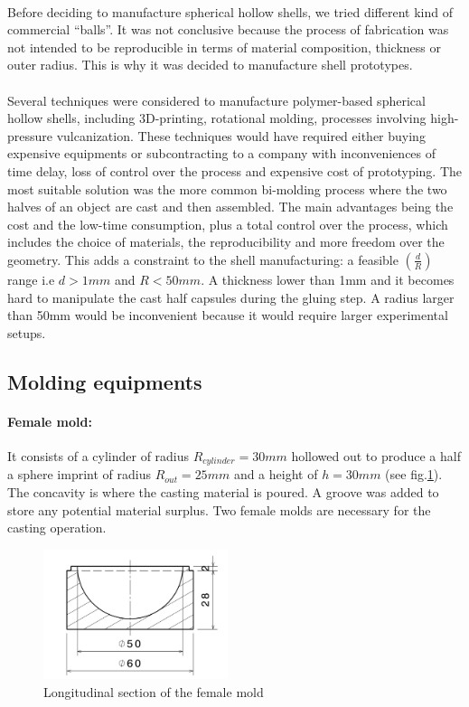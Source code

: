 \paragraph{}
Before deciding to manufacture spherical hollow shells, we tried different kind of commercial "`balls"'. It was not conclusive because the process of fabrication was not intended to be reproducible in terms of material composition, thickness or outer radius. This is why it was decided to manufacture shell prototypes.
\paragraph{}
Several techniques were considered to manufacture polymer-based spherical hollow shells, including 3D-printing, rotational molding, processes involving high-pressure vulcanization. These techniques would have required either buying expensive equipments or subcontracting to a company with inconveniences of time delay, loss of control over the process and expensive cost of prototyping. 
The most suitable solution was the more common bi-molding process where the two halves of an object are cast and then assembled. The main advantages being the cost and the low-time consumption, plus a total control over the process, which includes the choice of materials, the reproducibility and more freedom over the geometry.
This adds a constraint to the shell manufacturing: a feasible $(\frac{d}{R})$ range i.e $d > 1 mm$ and $R < 50 mm$. A thickness lower than 1mm and it becomes hard to manipulate the cast half capsules during the gluing step. A radius larger than 50mm would be inconvenient because it would require larger experimental setups.
\subsection{Molding equipments}

\paragraph{Female mold:}
It consists of a cylinder of radius $R_{cylinder}=30 mm$  hollowed out to produce a half a sphere imprint of radius $R_{out}=25 mm$ and a height of $h = 30 mm$ (see fig.\ref{fig:female_mold}). The concavity is where the casting material is poured.
A groove was added to store any potential material surplus. Two female molds are necessary for the casting operation.
\begin{figure}[H] %
	\centering%
		\includegraphics[width=0.48\textwidth]{figures/Chapter_1/female_mold.jpg}%
		\caption{Longitudinal section of the female mold}%
		\label{fig:female_mold}%
\end{figure}


